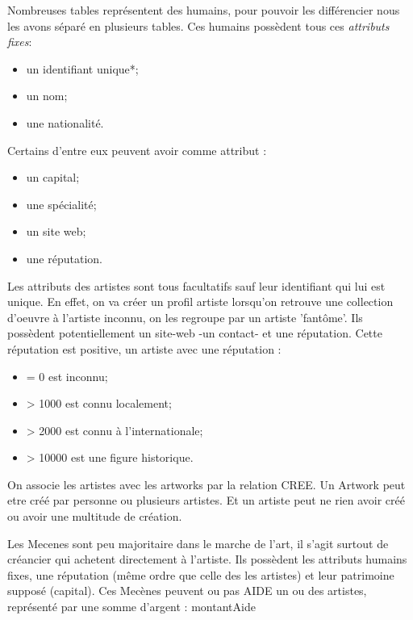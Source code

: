 \documentclass{article}
\begin{document}
\begin{multicols}{2}[]
Nombreuses tables représentent des humains, pour pouvoir les différencier nous les avons séparé en plusieurs tables.
Ces humains possèdent tous ces \emph{attributs fixes}:
\begin{itemize}[label=\(\blacktriangleright\)]
    \item un identifiant unique*;
    \item un nom;
    \item une nationalité.
\end{itemize}

Certains d'entre eux peuvent avoir comme attribut :
\begin{itemize}[label=\(\blacktriangleright\)]
    \item un capital;
    \item une spécialité;
    \item un site web;
    \item une réputation.
\end{itemize}
\end{multicols}


Les attributs des artistes sont tous facultatifs sauf leur identifiant qui lui est unique.
En effet, on va créer un profil artiste lorsqu'on retrouve une collection d'oeuvre à l'artiste inconnu, on les regroupe par un artiste 'fantôme'.
Ils possèdent potentiellement un site-web -un contact- et une réputation.
Cette réputation est positive, un artiste avec une réputation :
\begin{itemize}[label=\(\blacktriangleright\)]
    \item = 0 est inconnu;
    \item > 1000 est connu localement;
    \item > 2000 est connu à l'internationale;
    \item > 10000 est une figure historique.
\end{itemize}

On associe les artistes avec les artworks par la relation CREE.
Un Artwork peut etre créé par personne ou plusieurs artistes. Et un artiste peut ne rien avoir créé ou avoir une multitude de création.


Les Mecenes sont peu majoritaire dans le marche de l'art,
il s'agit surtout de créancier qui achetent directement à l'artiste. 
Ils possèdent les attributs humains fixes, une réputation (même ordre que celle des les artistes) et leur patrimoine supposé (capital).
Ces Mecènes peuvent ou pas AIDE un ou des artistes, représenté par une somme d'argent : montantAide 
\end{document}
